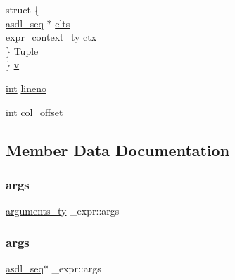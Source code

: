\begin{DoxyCompactItemize}
\begin{tabbing}
\>struct \{\\
\>\>\mbox{\hyperlink{structasdl__seq}{asdl\_seq}} $\ast$ \mbox{\hyperlink{struct__expr_a2b2486ad2f3a81e7d67645975c98c770}{elts}}\\
\>\>\mbox{\hyperlink{_python-ast_8h_a38710ce394ed6d5cc8ebe79a322dcdf9}{expr\_context\_ty}} \mbox{\hyperlink{struct__expr_a688663a3816864e9c5f400075663f475}{ctx}}\\
\>\} \mbox{\hyperlink{struct__expr_ab75d3bf255b13e9e7a125c1a8170f9b3}{Tuple}}\\
\} \mbox{\hyperlink{struct__expr_ae63e545ba29feacea603454ebfa92330}{v}}\\

\end{tabbing}\item 
\mbox{\hyperlink{warnings_8h_a74f207b5aa4ba51c3a2ad59b219a423b}{int}} \mbox{\hyperlink{struct__expr_a998fb97c3e3b6e418e07ba5a0e9673eb}{lineno}}
\item 
\mbox{\hyperlink{warnings_8h_a74f207b5aa4ba51c3a2ad59b219a423b}{int}} \mbox{\hyperlink{struct__expr_a9e8fb71f839ec6124be14f3aeec7d721}{col\+\_\+offset}}
\end{DoxyCompactItemize}


\subsection{Member Data Documentation}
\mbox{\label{struct__expr_a9c755c56d973a6ea7143b9c3fc52d69b}} 
\subsubsection{\texorpdfstring{args}{args}\hspace{0.1cm}{\footnotesize\ttfamily [1/2]}}
{\footnotesize\ttfamily \mbox{\hyperlink{_python-ast_8h_a45cc6e94d598fdc335d8c85739108a3e}{arguments\+\_\+ty}} \+\_\+expr\+::args}

\mbox{\label{struct__expr_a0c611fcb8aa3c27e5d8813683395ef71}} 
\subsubsection{\texorpdfstring{args}{args}\hspace{0.1cm}{\footnotesize\ttfamily [2/2]}}
{\footnotesize\ttfamily \mbox{\hyperlink{structasdl__seq}{asdl\+\_\+seq}}$\ast$ \+\_\+expr\+::args}

